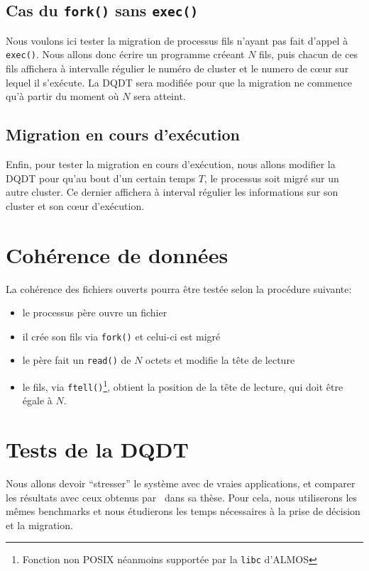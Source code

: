     \subsection{Cas du \texttt{fork()} sans \texttt{exec()}}

      Nous voulons ici tester la migration de processus fils n'ayant pas fait
      d'appel à \texttt{exec()}. Nous allons donc écrire un programme créeant
      $N$ fils, puis chacun de ces fils affichera à intervalle régulier le
      numéro de cluster et le numero de c\oe ur sur lequel il s'exécute. La DQDT
      sera modifiée pour que la migration ne commence qu'à partir du moment où
      $N$ sera atteint.

    \subsection{Migration en cours d'exécution}

      Enfin, pour tester la migration en cours d'exécution, nous allons modifier
      la DQDT pour qu'au bout d'un certain temps $T$, le processus soit migré
      sur un autre cluster. Ce dernier affichera à interval régulier les
      informations sur son cluster et son c\oe ur d'exécution.


  \section{Cohérence de données}

    La cohérence des fichiers ouverts pourra être testée selon la procédure
    suivante:
    \begin{itemize}
      \item le processus père ouvre un fichier
      \item il crée son fils via \texttt{fork()} et celui-ci est migré
      \item le père fait un \texttt{read()} de $N$ octets et modifie la tête de
        lecture
      \item le fils, via \texttt{ftell()}\footnote{Fonction non POSIX néanmoins
        supportée par la \texttt{libc} d'ALMOS}, obtient la position de la tête
        de lecture, qui doit être égale à $N$.
    \end{itemize}


  \section{Tests de la DQDT}
  \label{sec:dqdt-test}

    Nous allons devoir ``stresser'' le système avec de vraies applications, et
    comparer les résultats avec ceux obtenus
    par~\citeauthor{almaless2014universite} dans sa thèse. Pour cela, nous
    utiliserons les mêmes benchmarks et nous étudierons les temps nécessaires à
    la prise de décision et la migration.


